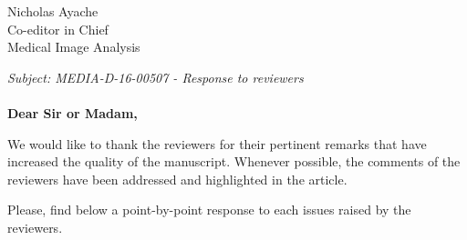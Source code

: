\documentclass{letter}
\begin{document}

\begin{letter}{Nicholas Ayache \\ Co-editor in Chief \\ Medical Image Analysis} %


  \opening{
    \textit{Subject: MEDIA-D-16-00507 - Response to reviewers}\\ \\
    \textbf{Dear Sir or Madam,}}

  We would like to thank the reviewers for their pertinent
  remarks that have increased the quality of the manuscript. Whenever
  possible, the comments of the reviewers have been addressed and
  highlighted in the article.

  Please, find below a point-by-point response to each issues raised
  by the reviewers.


\end{letter}
\end{document}
